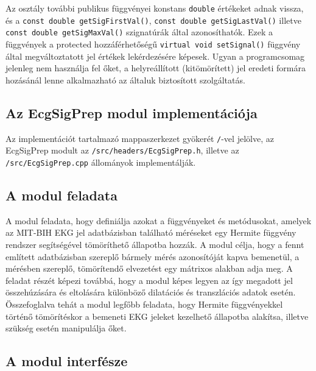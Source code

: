 \documentclass[oneside,titlepage,12pt,a4paper]{report}
\begin{document}
\par Az osztály további publikus függvényei konstans \texttt{double} értékeket adnak vissza, és a \texttt{const double getSigFirstVal()}, \texttt{const double getSigLastVal()} illetve \texttt{const double getSigMaxVal()} szignatúrák által azonosíthatók. Ezek a függvények a protected hozzáférhetőségű \texttt{virtual void setSignal()} függvény által megváltoztatott jel értékek lekérdezésére képesek. Ugyan a programcsomag jelenleg nem használja fel őket, a helyreállított (kitömörített) jel eredeti formára hozásánál lenne alkalmazható az általuk biztosított szolgáltatás.   


\subsection{Az EcgSigPrep modul implementációja} \label{subsec::ecgimpl}

Az implementációt tartalmazó mappaszerkezet gyökerét \texttt{/}-vel jelölve, az EcgSigPrep modult  az \texttt{/src/headers/EcgSigPrep.h}, illetve az \texttt{/src/EcgSigPrep.cpp} állományok implementálják. 

\subsection*{A modul feladata}

\par A modul feladata, hogy definiálja azokat a függvényeket és metódusokat, amelyek az MIT-BIH EKG jel adatbázisban található méréseket egy Hermite függvény rendszer segítségével tömöríthető állapotba hozzák. A modul célja, hogy a fennt említett adatbázisban szereplő bármely mérés azonosítóját kapva bemenetül, a mérésben szereplő, tömörítendő elvezetést egy mátrixos alakban adja meg. A feladat részét képezi továbbá, hogy a modul képes legyen az így megadott jel összehúzására és eltolására különböző dilatációs és transzlációs adatok esetén. Összefoglalva tehát a modul legfőbb feladata, hogy Hermite függvényekkel történő tömörítéskor a bemeneti EKG jeleket kezelhető állapotba alakítsa, illetve szükség esetén manipulálja őket.  

\subsection*{A modul interfésze}
\end{document}
